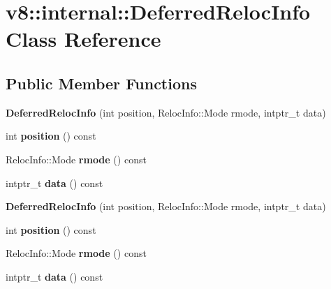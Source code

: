 \hypertarget{classv8_1_1internal_1_1_deferred_reloc_info}{}\section{v8\+:\+:internal\+:\+:Deferred\+Reloc\+Info Class Reference}
\label{classv8_1_1internal_1_1_deferred_reloc_info}
\subsection*{Public Member Functions}
\begin{DoxyCompactItemize}
\item 
{\bfseries Deferred\+Reloc\+Info} (int position, Reloc\+Info\+::\+Mode rmode, intptr\+\_\+t data)\hypertarget{classv8_1_1internal_1_1_deferred_reloc_info_a61bf993ce18b8e080067e99b5984aa51}{}\label{classv8_1_1internal_1_1_deferred_reloc_info_a61bf993ce18b8e080067e99b5984aa51}

\item 
int {\bfseries position} () const \hypertarget{classv8_1_1internal_1_1_deferred_reloc_info_af8b357261a538565c5233746d6285bf7}{}\label{classv8_1_1internal_1_1_deferred_reloc_info_af8b357261a538565c5233746d6285bf7}

\item 
Reloc\+Info\+::\+Mode {\bfseries rmode} () const \hypertarget{classv8_1_1internal_1_1_deferred_reloc_info_a6025be5ac36662a42c213104528f8f5d}{}\label{classv8_1_1internal_1_1_deferred_reloc_info_a6025be5ac36662a42c213104528f8f5d}

\item 
intptr\+\_\+t {\bfseries data} () const \hypertarget{classv8_1_1internal_1_1_deferred_reloc_info_a03708393df6f6a58a4aa98060ebeae08}{}\label{classv8_1_1internal_1_1_deferred_reloc_info_a03708393df6f6a58a4aa98060ebeae08}

\item 
{\bfseries Deferred\+Reloc\+Info} (int position, Reloc\+Info\+::\+Mode rmode, intptr\+\_\+t data)\hypertarget{classv8_1_1internal_1_1_deferred_reloc_info_a61bf993ce18b8e080067e99b5984aa51}{}\label{classv8_1_1internal_1_1_deferred_reloc_info_a61bf993ce18b8e080067e99b5984aa51}

\item 
int {\bfseries position} () const \hypertarget{classv8_1_1internal_1_1_deferred_reloc_info_af8b357261a538565c5233746d6285bf7}{}\label{classv8_1_1internal_1_1_deferred_reloc_info_af8b357261a538565c5233746d6285bf7}

\item 
Reloc\+Info\+::\+Mode {\bfseries rmode} () const \hypertarget{classv8_1_1internal_1_1_deferred_reloc_info_a6025be5ac36662a42c213104528f8f5d}{}\label{classv8_1_1internal_1_1_deferred_reloc_info_a6025be5ac36662a42c213104528f8f5d}

\item 
intptr\+\_\+t {\bfseries data} () const \hypertarget{classv8_1_1internal_1_1_deferred_reloc_info_a03708393df6f6a58a4aa98060ebeae08}{}\label{classv8_1_1internal_1_1_deferred_reloc_info_a03708393df6f6a58a4aa98060ebeae08}

\end{DoxyCompactItemize}
